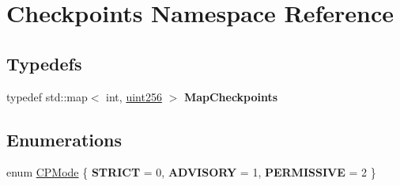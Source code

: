\hypertarget{namespace_checkpoints}{}\section{Checkpoints Namespace Reference}
\label{namespace_checkpoints}
\subsection*{Typedefs}
\begin{DoxyCompactItemize}
\item 
\mbox{\label{namespace_checkpoints_a996cca530c4568a2eb4516e8f351b9a2}} 
typedef std\+::map$<$ int, \mbox{\hyperlink{classuint256}{uint256}} $>$ {\bfseries Map\+Checkpoints}
\end{DoxyCompactItemize}
\subsection*{Enumerations}
\begin{DoxyCompactItemize}
\item 
enum \mbox{\hyperlink{namespace_checkpoints_ab7f99b2c7e9fc7152af4f4bf36816c83}{C\+P\+Mode}} \{ {\bfseries S\+T\+R\+I\+CT} = 0, 
{\bfseries A\+D\+V\+I\+S\+O\+RY} = 1, 
{\bfseries P\+E\+R\+M\+I\+S\+S\+I\+VE} = 2
 \}
\end{DoxyCompactItemize}
